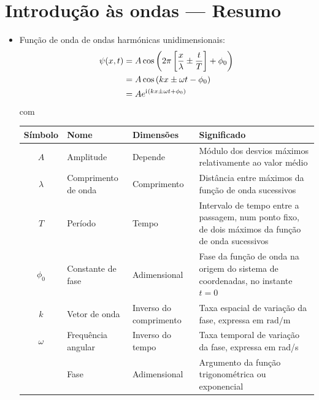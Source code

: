 \newpage
\section{Introdução às ondas --- Resumo}
\begin{itemize}
\item
    Função de onda de ondas harmónicas unidimensionais:
    \begin{align*}
      \psi(x,t)&=A\cos\left(2\pi\left[\frac{x}{\lambda}\pm\frac{t}{T}\right]+
                \phi_0\right)\\
               &=A\cos\left(kx\pm\omega t-\phi_0\right)\\
               &=Ae^{\text{i}\mkern1mu (kx\pm\omega t+\phi_0)}
    \end{align*}
    com
    \begin{center}
    \begin{tabular}{c|l|l|l}
    \hline
    \rule{0mm}{3ex} Símbolo&Nome&Dimensões&Significado\\[0.5ex]
    \hline
    $A$ & Amplitude & Depende&
        \parbox[t]{0.3\textwidth}{\rule{0mm}{4ex}Módulo dos desvios máxi\-mos
        relativamente ao valor médio}\\
    $\lambda$ & Comprimento de onda & Comprimento &
        \parbox[t]{0.3\textwidth}{\rule{0mm}{4ex}Distância entre máximos da função
        de onda sucessivos} \\
    $T$ & Período & Tempo &
        \parbox[t]{0.3\textwidth}{\rule{0mm}{4ex}Intervalo de tempo entre a
        passagem, num ponto fixo, de dois máximos da função de onda sucessivos}
    \\
    $\phi_0$&Constante de fase&Adimensional&
        \parbox[t]{0.3\textwidth}{\rule{0mm}{4ex}Fase da função de onda na
        origem do sistema de coordenadas, no instante $t=0$}\\
    $k$&Vetor de onda&
        \parbox[t]{0.2\textwidth}{Inverso do comprimento}&
        \parbox[t]{0.3\textwidth}{\rule{0mm}{4ex}Taxa espacial de variação da fase,
        expressa em $\text{rad}/\text{m}$}\\
    $\omega$&Frequência angular &
        \parbox[t]{0.2\textwidth}{Inverso do tempo}&
        \parbox[t]{0.3\textwidth}{\rule{0mm}{4ex}Taxa temporal de variação da
        fase, expressa em rad/s}
        \\
        &Fase& Adimensional &\parbox[t]{0.3\textwidth}{\rule{0mm}{4ex}%
          Argumento da função trigonométrica ou exponencial}
    \\[3ex]
    \hline
    \end{tabular}

\end{center}
\end{itemize}
